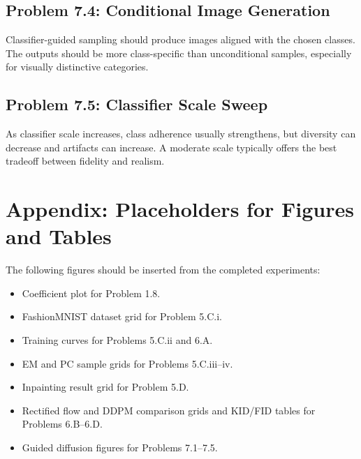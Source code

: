 \documentclass[11pt]{article}
\begin{document}
\subsection*{Problem 7.4: Conditional Image Generation}
Classifier-guided sampling should produce images aligned with the chosen classes. The outputs should be more class-specific than unconditional samples, especially for visually distinctive categories.

\subsection*{Problem 7.5: Classifier Scale Sweep}
As classifier scale increases, class adherence usually strengthens, but diversity can decrease and artifacts can increase. A moderate scale typically offers the best tradeoff between fidelity and realism.

\section*{Appendix: Placeholders for Figures and Tables}
The following figures should be inserted from the completed experiments:
\begin{itemize}[leftmargin=1.25em]
    \item Coefficient plot for Problem 1.8.
    \item FashionMNIST dataset grid for Problem 5.C.i.
    \item Training curves for Problems 5.C.ii and 6.A.
    \item EM and PC sample grids for Problems 5.C.iii--iv.
    \item Inpainting result grid for Problem 5.D.
    \item Rectified flow and DDPM comparison grids and KID/FID tables for Problems 6.B--6.D.
    \item Guided diffusion figures for Problems 7.1--7.5.
\end{itemize}
\end{document}
